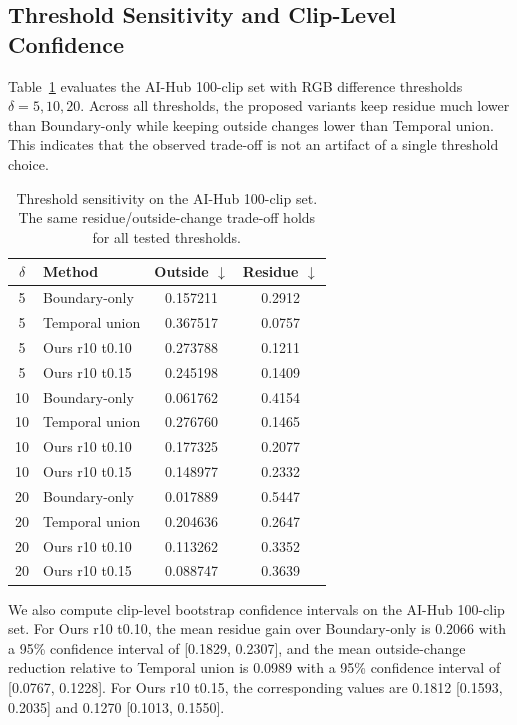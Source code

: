 \documentclass[nouppercase]{kaia}
\begin{document}
\subsection{Threshold Sensitivity and Clip-Level Confidence}
Table~\ref{tab:threshold} evaluates the AI-Hub 100-clip set with RGB difference thresholds $\delta=5,10,20$. Across all thresholds, the proposed variants keep residue much lower than Boundary-only while keeping outside changes lower than Temporal union. This indicates that the observed trade-off is not an artifact of a single threshold choice.

\begin{table}[h]
\begin{center}
\begin{tabular}{|c|l|c|c|}
\hline
$\delta$ & Method & Outside $\downarrow$ & Residue $\downarrow$ \\
\hline\hline
5 & Boundary-only & 0.157211 & 0.2912 \\
5 & Temporal union & 0.367517 & 0.0757 \\
5 & Ours r10 t0.10 & 0.273788 & 0.1211 \\
5 & Ours r10 t0.15 & 0.245198 & 0.1409 \\
\hline
10 & Boundary-only & 0.061762 & 0.4154 \\
10 & Temporal union & 0.276760 & 0.1465 \\
10 & Ours r10 t0.10 & 0.177325 & 0.2077 \\
10 & Ours r10 t0.15 & 0.148977 & 0.2332 \\
\hline
20 & Boundary-only & 0.017889 & 0.5447 \\
20 & Temporal union & 0.204636 & 0.2647 \\
20 & Ours r10 t0.10 & 0.113262 & 0.3352 \\
20 & Ours r10 t0.15 & 0.088747 & 0.3639 \\
\hline
\end{tabular}
\end{center}
\caption{Threshold sensitivity on the AI-Hub 100-clip set. The same residue/outside-change trade-off holds for all tested thresholds.}
\label{tab:threshold}
\end{table}

We also compute clip-level bootstrap confidence intervals on the AI-Hub 100-clip set. For Ours r10 t0.10, the mean residue gain over Boundary-only is 0.2066 with a 95\% confidence interval of [0.1829, 0.2307], and the mean outside-change reduction relative to Temporal union is 0.0989 with a 95\% confidence interval of [0.0767, 0.1228]. For Ours r10 t0.15, the corresponding values are 0.1812 [0.1593, 0.2035] and 0.1270 [0.1013, 0.1550].
\end{document}

